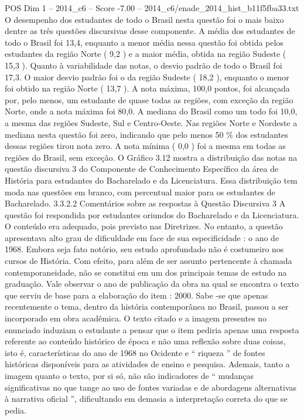 \begin{textsample}{POS Dim 1 – 2014\_c6 – Score -7.00 – 2014\_c6/enade\_2014\_hist\_b11f5fba33.txt}
O desempenho dos estudantes de todo o Brasil nesta questão foi o mais baixo dentre as três questões discursivas desse componente.
A média dos estudantes de todo o Brasil foi 13,4, enquanto a menor média nessa questão foi obtida pelos estudantes da região Norte ( 9,2 ) e a maior média, obtida na região Sudeste ( 15,3 ).
Quanto à variabilidade das notas, o desvio padrão de todo o Brasil foi 17,3.
O maior desvio padrão foi o da região Sudeste ( 18,2 ), enquanto o menor foi obtido na região Norte ( 13,7 ).
A nota máxima, 100,0 pontos, foi alcançada por, pelo menos, um estudante de quase todas as regiões, com exceção da região Norte, onde a nota máxima foi 80,0.
A mediana do Brasil como um todo foi 10,0, a mesma das regiões Sudeste, Sul e Centro-Oeste.
Nas regiões Norte e Nordeste a mediana nesta questão foi zero, indicando que pelo menos 50 \% dos estudantes dessas regiões tirou nota zero.
A nota mínima ( 0,0 ) foi a mesma em todas as regiões do Brasil, sem exceção.
O Gráfico 3.12 mostra a distribuição das notas na questão discursiva 3 do Componente de Conhecimento Específico da área de História para estudantes do Bacharelado e da Licenciatura.
Essa distribuição tem moda nas questões em branco, com percentual maior para os estudantes de Bacharelado. 3.3.2.2 Comentários sobre as respostas à Questão Discursiva 3 A questão foi respondida por estudantes oriundos do Bacharelado e da Licenciatura.
O conteúdo era adequado, pois previsto nas Diretrizes.
No entanto, a questão apresentava alto grau de dificuldade em face de sua especificidade : o ano de 1968.
Embora seja fato notório, seu estudo aprofundado não é costumeiro nos cursos de História.
Com efeito, para além de ser assunto pertencente à chamada contemporaneidade, não se constitui em um dos principais temas de estudo na graduação.
Vale observar o ano de publicação da obra na qual se encontra o texto que serviu de base para a elaboração do item : 2000.
Sabe -se que apenas recentemente o tema, dentro da história contemporânea no Brasil, passou a ser incorporado em obra acadêmica.
O texto citado e a imagem presentes no enunciado induziam o estudante a pensar que o item pediria apenas uma resposta referente ao conteúdo histórico de época e não uma reflexão sobre duas coisas, isto é, características do ano de 1968 no Ocidente e “ riqueza ” de fontes históricas disponíveis para as atividades de ensino e pesquisa.
Ademais, tanto a imagem quanto o texto, por si só, não são indicadores de “ mudanças significativas no que tange ao uso de fontes variadas e de abordagens alternativas à narrativa oficial ”, dificultando em demasia a interpretação correta do que se pedia.

\end{textsample}
